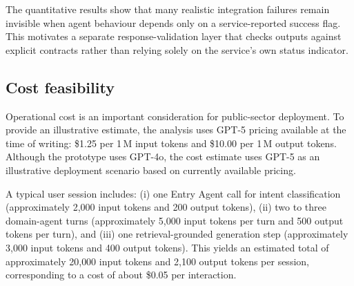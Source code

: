 \documentclass[3p,times,procedia]{elsarticle}
\begin{document}
The quantitative results show that many realistic integration failures remain invisible when agent behaviour depends only on a service-reported success flag. This motivates a separate response-validation layer that checks outputs against explicit contracts rather than relying solely on the service's own status indicator.

\subsection{Cost feasibility}
\label{subsec:cost}

Operational cost is an important consideration for public-sector deployment. To provide an illustrative estimate, the analysis uses GPT-5 pricing available at the time of writing: \$1.25 per 1\,M input tokens and \$10.00 per 1\,M output tokens. Although the prototype uses GPT-4o, the cost estimate uses GPT-5 as an illustrative deployment scenario based on currently available pricing.

A typical user session includes: (i) one Entry Agent call for intent classification (approximately 2{,}000 input tokens and 200 output tokens), (ii) two to three domain-agent turns (approximately 5{,}000 input tokens per turn and 500 output tokens per turn), and (iii) one retrieval-grounded generation step (approximately 3{,}000 input tokens and 400 output tokens). This yields an estimated total of approximately 20{,}000 input tokens and 2{,}100 output tokens per session, corresponding to a cost of about \$0.05 per interaction.

\end{document}

